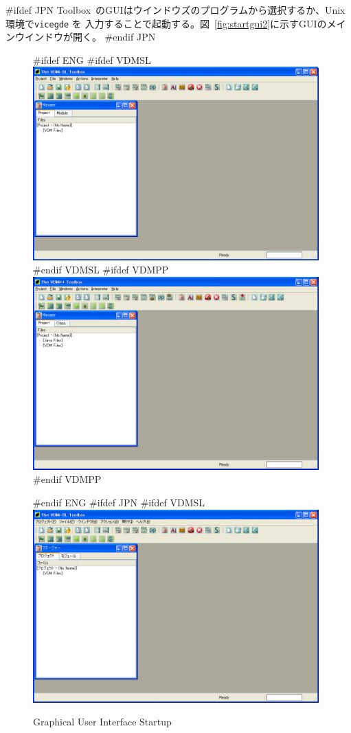 \documentclass[\pformat,12pt]{article}
\newcommand{\Toolbox}{Toolbox}
\newcommand{\vdmgde}{vdmgde}
\newcommand{\Toolbox}{Toolbox}
\newcommand{\vdmgde}{vppgde}
\renewcommand{\vdmgde}{vicegde}
\begin{document}
#ifdef JPN
\Toolbox\ のGUIはウインドウズのプログラムから選択するか、Unix環境で{\tt \vdmgde} を
入力することで起動する。図~\ref{fig:startgui2}に示すGUIのメインウインドウが開く。
#endif JPN

\begin{figure}[tbh]
\begin{center}
#ifdef ENG
#ifdef VDMSL
\includegraphics[width=11cm]{startgui-slENG.png}
#endif VDMSL
#ifdef VDMPP
\includegraphics[width=11cm]{startgui-ppENG.png}
#endif VDMPP
\caption{Graphical User Interface Startup}
#endif ENG
#ifdef JPN
#ifdef VDMSL
\includegraphics[width=11cm]{startgui-sl.png}

\end{center}
\end{figure}
\end{document}
